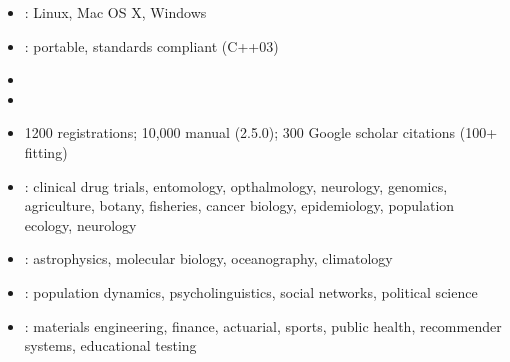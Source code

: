 \documentclass[10pt]{report}
\begin{document}
\vspace*{-2pt}
\begin{itemize}
\item {}:  Linux, Mac OS X, Windows
\item {}: {\small portable, standards compliant (C++03)}
\item {}
\item {}
\end{itemize}
\vfill


\begin{itemize}
\item 1200  registrations;  10,000 manual
   (2.5.0); 300 Google scholar citations (100+ fitting)
\item {}: {\footnotesize
clinical drug trials, entomology, opthalmology,
neurology, genomics, agriculture, botany, fisheries,
cancer biology, epidemiology, population ecology, neurology
}
\item {}: {\footnotesize 
astrophysics, molecular biology, oceanography, climatology
}
\item {}: {\footnotesize
 population dynamics, psycholinguistics, social networks, political science
}
\item {}: {\footnotesize materials engineering, finance, actuarial,
  sports, public health, recommender systems, educational testing}
\end{itemize}
\end{document}
